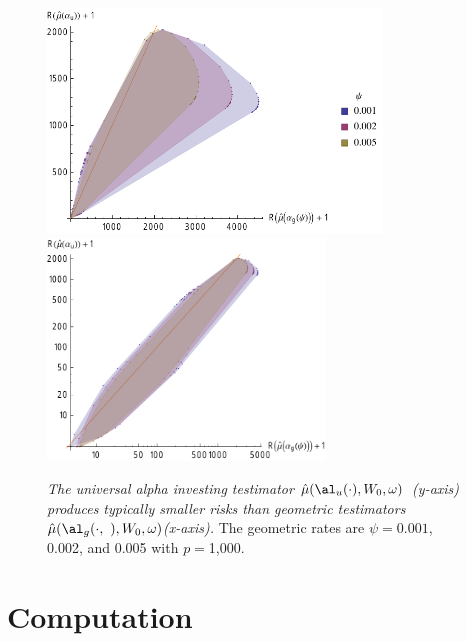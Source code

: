 \documentclass{gSCS2e}
\newcommand{\uTest}{\mbox{$\hat\mu(\al_u(\cdot),W_0,\omega)$}}
\newcommand{\gTest}[1]{\mbox{$\hat\mu(\al_g(\cdot,{#1}),W_0,\omega)$}}
\begin{document}
 \begin{figure}
 \caption{ \label{fig:univGeo} {\sl The universal alpha investing testimator
 \uTest\ (y-axis) produces typically smaller risks than geometric testimators
 \gTest\ (x-axis).}  The geometric rates are $\psi = 0.001$, 0.002, and 0.005 with
 $p=$1,000.}

 \vspace{0.1in}
 \centerline{
     \includegraphics[width=3.5in]{figures/univGeo}
     \includegraphics[width=2.9in]{figures/univGeoLog} }
 \vspace{0.2in}
 \end{figure}



\section{ Computation }
\end{document}
